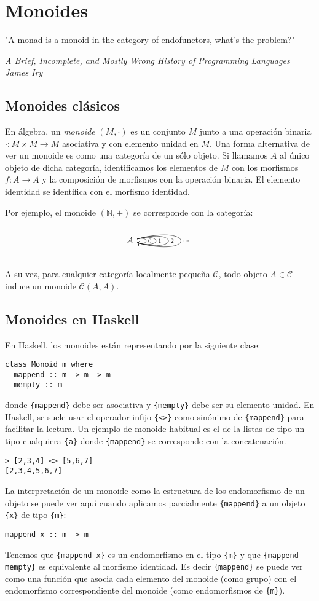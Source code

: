 \documentclass[12pt, twoside]{book}
\newcommand{\newterm}[1]{\index{#1}\emph{#1}}
\newcommand{\code}[1]{\Verb+{#1}+}
\newcommand{\cat}{{\mathcal{C}}}
\begin{document}
\chapter{Monoides}
\epigraph{"A monad is a monoid in the category of endofunctors, what's the problem?"}{\textit{A Brief, Incomplete, and Mostly Wrong History of Programming Languages\\James Iry}}
\section{Monoides clásicos}
En álgebra, un \newterm{monoide} $(M,\cdot)$ es un conjunto $M$ junto a una operación binaria $\cdot \colon M \times M \to M$ asociativa y con elemento unidad en $M$.
Una forma alternativa de ver un monoide es como una categoría de un sólo objeto.
Si llamamos $A$ al único objeto de dicha categoría, identificamos los elementos de $M$ con los morfismos $f \colon A \to A$ y la composición de morfismos con la operación binaria.
El elemento identidad se identifica con el morfismo identidad.

Por ejemplo, el monoide $(\mathbb{N},+)$ se corresponde con la categoría:
\[
\begin{tikzcd}
A \arrow[loop right,"0" right] \arrow[loop right,distance=3em,"1" right] \arrow[loop right,distance=5em,"2" right]
\arrow[loop right,distance=7em,"\dots" right]
\end{tikzcd}
\]

A su vez, para cualquier categoría localmente pequeña $\cat$, todo objeto $A \in \cat$ induce un monoide $\cat(A,A)$.

\section{Monoides en Haskell}
En Haskell, los monoides están representando por la siguiente clase:
\begin{verbatim}
class Monoid m where
  mappend :: m -> m -> m
  mempty :: m
\end{verbatim}
donde \code{mappend} debe ser asociativa y \code{mempty} debe ser su elemento unidad.
En Haskell, se suele usar el operador infijo \code{<>} como sinónimo de \code{mappend} para facilitar la lectura.
Un ejemplo de monoide habitual es el de la listas de tipo un tipo cualquiera \code{a} donde \code{mappend} se corresponde con la concatenación.
\begin{verbatim}
> [2,3,4] <> [5,6,7]
[2,3,4,5,6,7]
\end{verbatim}
La interpretación de un monoide como la estructura de los endomorfismo de un objeto se puede ver aquí cuando aplicamos parcialmente \code{mappend} a un objeto \code{x} de tipo \code{m}:
\begin{verbatim}
mappend x :: m -> m
\end{verbatim}
Tenemos que \code{mappend x} es un endomorfismo en el tipo \code{m} y que \code{mappend mempty} es equivalente al morfismo identidad.
Es decir \code{mappend} se puede ver como una función que asocia cada elemento del monoide (como grupo) con el endomorfismo correspondiente del monoide (como endomorfismos de \code{m}).
\end{document}

